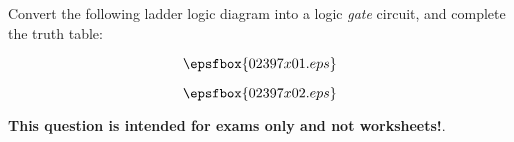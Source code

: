 

Convert the following ladder logic diagram into a logic {\it gate} circuit, and complete the truth table:

$$\epsfbox{02397x01.eps}$$







$$\epsfbox{02397x02.eps}$$







{\bf This question is intended for exams only and not worksheets!}.




